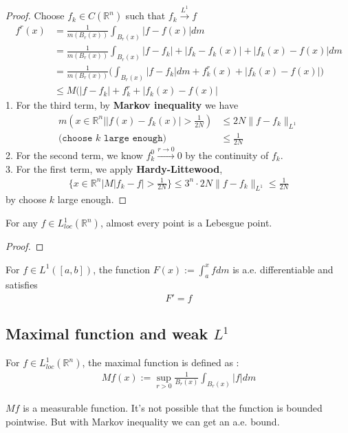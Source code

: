 \begin{proof}
Choose $f_k \in C(\mathbb{R}^n)$ such that $f_k \overset{L^1}{\longrightarrow} f$ 
	\begin{align*}
		f^r(x) &= \frac{1}{m(B_r(x))} \int_{B_r(x)}|f - f(x)|dm\\
		&= \frac{1}{m(B_r(x))}\int_{B_r(x)} |f - f_k| + |f_k - f_k(x)| + |f_k(x) - f(x)|dm\\
		&= \frac{1}{m(B_r(x))}\bigg( \int_{B_r(x)} |f-f_k|dm + f^r_k(x) + |f_k(x) - f(x)|\bigg) \\
		&\le M(|f - f_k| + f^r_k + |f_k(x) - f(x)|
	\end{align*}
	1. For the third term, by \textbf{Markov inequality} we have
	\begin{align*}
		m(x \in \mathbb{R}^n| |f(x) - f_k(x)| > \frac{1}{2N}) &\le 2N \|f - f_k\|_{L^1}\\
		(\texttt{choose $k$ large enough)}
		&\le \frac{1}{2N}
	\end{align*}
	2. For the second term, we know $f^0_k \overset{r \rightarrow 0}{\longrightarrow} 0$ by the continuity of $f_k$. \\
	3. For the first term, we apply \textbf{Hardy-Littewood}, 
	\begin{align*}
		\{x \in \mathbb{R}^n| M|f_k - f| > \frac{1}{2N}\} \le 3^n\cdot 2N\|f - f_k\|_{L^1}\le \frac{1}{2N}
	\end{align*}
	by choose $k$ large enough. 
\end{proof}


\begin{theorem}
	For any $f \in L^1_{loc}(\mathbb{R}^n)$, almost every point is a Lebesgue point. 
\end{theorem}
\begin{proof}
	
\end{proof}

\begin{corollary}	
	For $f \in L^1([a, b])$, the function $F(x) := \int_a^x fdm$ is a.e. differentiable and satisfies 
	\begin{align*}
		F' = f
	\end{align*}
\end{corollary}


\subsection{Maximal function and weak \texorpdfstring{$L^1$}{L\textasciicircum{}1}}
\begin{definition}
	For $f \in L_{loc}^1(\mathbb{R}^n)$, the maximal function is defined as :
	\begin{align*}
		Mf(x):= \sup_{r > 0}\frac{1}{B_r(x)}\int_{B_r(x)}|f|dm
	\end{align*}
\end{definition}
\begin{remark}
$Mf$ is a measurable function. It's not possible that the function is bounded pointwise. But with Markov inequality we can get an a.e. bound.
\end{remark}

